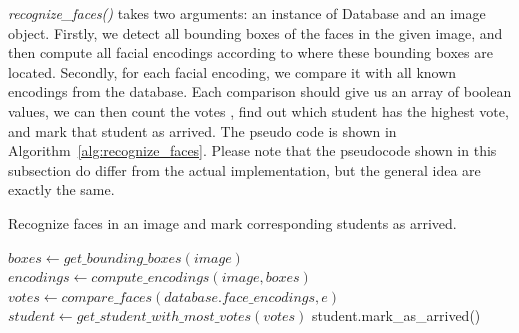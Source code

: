 \emph{recognize\_faces()} takes two arguments: an instance of Database and an image object.
Firstly, we detect all bounding boxes of the faces in the given image, and then
compute all facial encodings according to where these bounding boxes are located.
Secondly, for each facial encoding, we compare it with all known encodings from the database.
Each comparison should give us an array of boolean values, we can then count the votes
, find out which student has the highest vote, and mark that student as arrived.
The pseudo code is shown in Algorithm~\ref{alg:recognize_faces}.
Please note that the pseudocode shown in this subsection do differ from the actual implementation,
but the general idea are exactly the same.
\vspace{0.2cm}

\begin{algorithm}
  \caption{Recognize faces in an image and mark corresponding students as arrived.}
  \label{alg:recognize_faces}
  \begin{algorithmic}
      \State $boxes \leftarrow get\_bounding\_boxes(image)$
      \State $encodings \leftarrow compute\_encodings(image, boxes)$
      \State 
        \State $votes \leftarrow compare\_faces(database.face\_encodings, e)$
        \State  $student \leftarrow get\_student\_with\_most\_votes(votes)$
        \State student.mark\_as\_arrived()
      \EndFor
    \EndProcedure
  \end{algorithmic}
\end{algorithm}
\vspace{0.5cm}
